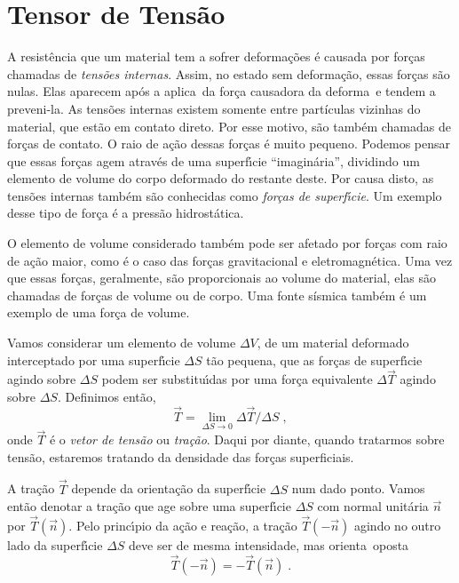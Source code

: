 \section{Tensor de Tens\~ao}
\label{tensor_tens}

A resist\^encia que um material tem a sofrer deforma\c{c}\~oes
\'e causada por for\c{c}as chamadas de {\it
tens\~oes internas}. Assim, no estado sem deforma\c{c}\~ao,
essas for\c{c}as s\~ao nulas. Elas aparecem ap\'os a aplica\cao\
da for\c{c}a causadora da deforma\cao\ e tendem a preveni-la.
As tens\~oes internas existem somente entre part\'iculas vizinhas
do material, que est\~ao em contato direto. Por esse motivo,
s\~ao tamb\'em chamadas de for\c{c}as de contato.
O raio de a\c{c}\~ao dessas for\c{c}as \'e muito
pequeno. Podemos pensar que essas for\c{c}as agem atrav\'es de uma
superf\'{\i}cie ``imagin\'aria'', dividindo um elemento de volume
do corpo deformado do restante deste. Por causa disto, as tens\~oes
internas tamb\'em s\~ao conhecidas como {\it for\c{c}as de
superf\'{\i}cie}. Um exemplo desse tipo de for\c{c}a \'e a press\~ao
hidrost\'atica.

O elemento de volume considerado tamb\'em pode ser afetado por
for\c{c}as com raio de a\c{c}\~ao maior, como \'e o caso das
for\c{c}as gravitacional e eletromagn\'etica. Uma vez que essas
for\c{c}as, geralmente, s\~ao proporcionais ao volume do material,
elas s\~ao chamadas de for\c{c}as de volume ou de corpo. Uma fonte
s\'ismica tamb\'em \'e um exemplo de uma for\c{c}a de volume.

Vamos considerar um elemento de volume $\Delta V$, de um material
deformado interceptado por uma superf\'{\i}cie $\Delta S$ t\~ao
pequena, que as for\c{c}as de superf\'{\i}cie agindo sobre $\Delta
S$ podem ser substitu\'{\i}das por uma for\c{c}a equivalente
$\Delta \vec{T}$ agindo sobre $\Delta S$. Definimos ent\~ao,
\begin{equation}
\vec{T} = \lim_{\Delta S \rightarrow 0} {\Delta \vec{T} / \Delta
S}\;, \end{equation} onde $\vec{T}$ \'e o {\it vetor de tens\~ao}
ou {\it tra\c{c}\~ao}. Daqui por diante, quando tratarmos sobre
tens\~ao, estaremos tratando da densidade das for\c{c}as superficiais.

A tra\c{c}\~ao $\vec{T}$ depende da orienta\c{c}\~ao da
superf\'{\i}cie $\Delta S$ num dado ponto. Vamos ent\~ao denotar a
tra\c{c}\~ao que age sobre uma superf\'{\i}cie $\Delta S$ com
normal unit\'aria $\vec{n}$ por $\vec{T}(\vec{n})$. Pelo
princ\'{\i}pio da a\c{c}\~ao e rea\c{c}\~ao, a tra\c{c}\~ao
$\vec{T}(-\vec{n})$ agindo no outro lado da superf\'{\i}cie
$\Delta S$ deve ser de mesma intensidade, mas orienta\cao\ oposta
\begin{equation}
\vec{T}(-\vec{n})=-\vec{T}(\vec{n})\;.
\end{equation}

